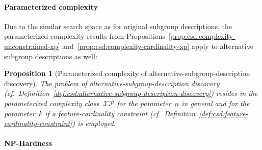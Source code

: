\documentclass{article}
\newtheorem{proposition}{Proposition}
\theoremstyle{definition}
\begin{document}
\paragraph{Parameterized complexity}

Due to the similar search space as for original subgroup descriptions, the parameterized-complexity results from Propositions~\ref{prop:csd:complexity-unconstrained-xp} and~\ref{prop:csd:complexity-cardinality-xp} apply to alternative subgroup descriptions as well:
\begin{proposition}[Parameterized complexity of alternative-subgroup-description discovery]
	The problem of alternative-subgroup-description discovery (cf.~Definition~\ref{def:csd:alternative-subgroup-description-discovery}) resides in the parameterized complexity class~$\mathcal{XP}$ for the parameter~$n$ in general and for the parameter~$k$ if a feature-cardinality constraint (cf.~Definition~\ref{def:csd:feature-cardinality-constraint}) is employed.
	\label{prop:csd:complexity-alternatives-xp}
\end{proposition}

\paragraph{NP-Hardness}
\end{document}
